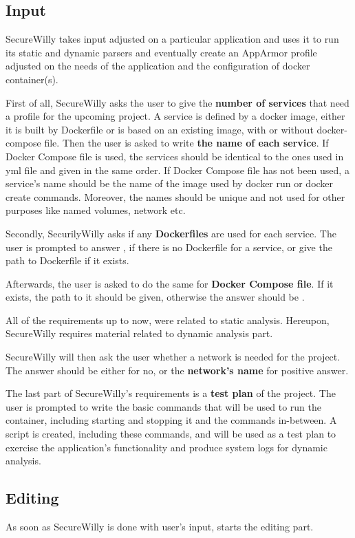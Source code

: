 \subsection{Input}
SecureWilly takes input adjusted on a particular application and uses it to run its static and dynamic parsers and eventually create an AppArmor profile adjusted on the needs of the application and the configuration of docker container(s).

First of all, SecureWilly asks the user to give the \textbf{number of services} that need a profile for the upcoming project. A service is defined by a docker image, either it is built by Dockerfile or is based on an existing image, with or without docker-compose file. Then the user is asked to write \textbf{the name of each service}. If Docker Compose file is used, the services should be identical to the ones used in yml file and given in the same order. If Docker Compose file has not been used, a service's name should be the name of the image used by docker run or docker create commands. Moreover, the names should be unique and not used for other purposes like named volumes, network etc.

Secondly, SecurilyWilly asks if any \textbf{Dockerfiles} are used for each service. The user is prompted to answer , if there is no Dockerfile for a service, or give the path to Dockerfile if it exists.

Afterwards, the user is asked to do the same for \textbf{Docker Compose file}. If it exists, the path to it should be given, otherwise the answer should be .

All of the requirements up to now, were related to static analysis. Hereupon, SecureWilly requires material related to dynamic analysis part.

SecureWilly will then ask the user whether a network is needed for the project. The answer should be either  for no, or the \textbf{network's name} for positive answer.

The last part of SecureWilly's requirements is a \textbf{test plan} of the project. The user is prompted to write the basic commands that will be used to run the container, including starting and stopping it and the commands in-between. A script is created, including these commands, and will be used as a test plan to exercise the application's functionality and produce system logs for dynamic analysis.

\subsection{Editing}
As soon as SecureWilly is done with user's input, starts the editing part.

